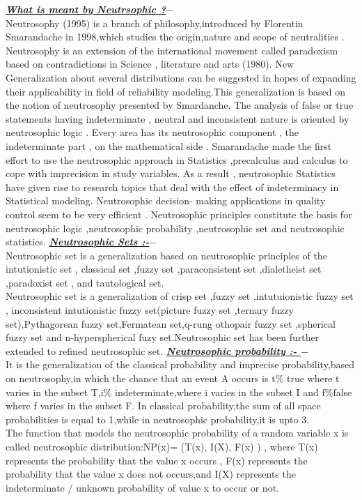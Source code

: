 \documentclass[12pt,a4paper,oneside]{article}
\author{Saunak Mitra}
\begin{document}
\textrm{\textit{\textbf{\underline{What is meant by Neutrsophic ?$-$}}}}\\
Neutrosophy (1995) is a branch of philosophy,introduced by Florentin Smarandache in 1998,which studies the origin,nature and scope of neutralities .  Neutrosophy  is an extension of the international movement called paradoxism based on contradictions  in Science , literature and arts (1980). New  Generalization   about several distributions  can be suggested in hopes of expanding  their applicability in field of reliability modeling.This  generalization is based on the  notion of  neutrosophy presented by Smardanche. The analysis  of false or true  statements  having indeterminate ,  neutral   and inconsistent nature is oriented by neutrosophic  logic . Every area has its  neutrosophic component , the indeterminate part , on the mathematical side . Smarandache made the first effort to use the neutrosophic  approach in Statistics ,precalculus  and calculus to cope with imprecision in study variables. As a result , neutrosophic  Statistics have given rise to research topics  that deal with the effect of indeterminacy in Statistical modeling. Neutrosophic  decision- making applications in quality control seem to be very efficient . Neutrosophic principles constitute the basis for neutrosophic logic ,neutrosophic probability ,neutrosophic set  and neutrosophic statistics.\newline\newline
\textrm{\textit{\textbf{\underline{Neutrosophic  Sets :-$-$}}}}\\
Neutrosophic  set is a generalization based on  neutrosophic principles of the intutionistic  set , classical set ,fuzzy set ,paraconsistent set ,dialetheist set ,paradoxist set , and tautological set. \\
Neutrosophic set is a generalization of crisp set ,fuzzy set ,intutuionistic fuzzy set , inconsistent intutionistic  fuzzy set(picture fuzzy set ,ternary fuzzy set),Pythagorean fuzzy set,Fermatean set,q-rung othopair fuzzy set ,spherical fuzzy set  and n-hyperspherical fuzy set.Neutrosophic set has been further extended to  refined neutrosophic set.\newline\newline
\textrm{\textit{\textbf{\underline{Neutrosophic probability :- $-$}}}}\\
It is the generalization of the classical probability and imprecise probability,based on neutrosophy,in which the chance that an event A occurs is t$\%$ true where t varies in the subset T,i$\%$ indeterminate,where i varies in the subset I and f$\%$false where f varies in the subset F. In classical probability,the sum of all space probabilities is equal to 1,while in neutrosophic probability,it is upto 3.\\The function that models the neutrosophic probability of a random variable x is called neutrosophic distribution:NP(x)= (T(x), I(X), F(x) ) , where  T(x) represents the probability that the value x occurs , F(x) represents the probability that the value x does not occurs,and I(X) represents the indeterminate $/$ unknown probability of value x to occur or not.\newline\newline
\end{document}
